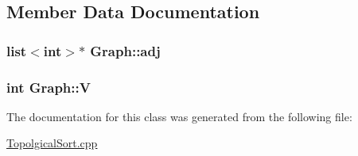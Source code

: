 \subsection{Member Data Documentation}
\subsubsection[{\texorpdfstring{adj}{adj}}]{\setlength{\rightskip}{0pt plus 5cm}list$<$int$>$$\ast$ Graph\+::adj\hspace{0.3cm}{\ttfamily [private]}}\hypertarget{classGraph_a04ab9c17ad31aa036def8db0f88b035b}{}\label{classGraph_a04ab9c17ad31aa036def8db0f88b035b}
\subsubsection[{\texorpdfstring{V}{V}}]{\setlength{\rightskip}{0pt plus 5cm}int Graph\+::V\hspace{0.3cm}{\ttfamily [private]}}\hypertarget{classGraph_a2b722f7cfa7a21e4cb5fae488b3d4dcc}{}\label{classGraph_a2b722f7cfa7a21e4cb5fae488b3d4dcc}


The documentation for this class was generated from the following file\+:\begin{DoxyCompactItemize}
\item 
\hyperlink{TopolgicalSort_8cpp}{Topolgical\+Sort.\+cpp}\end{DoxyCompactItemize}
